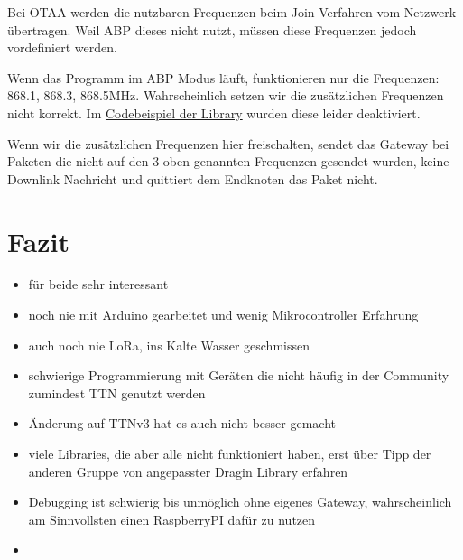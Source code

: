 \documentclass[12pt]{article}
\begin{document}
        Bei OTAA werden die nutzbaren Frequenzen beim Join-Verfahren vom Netzwerk übertragen.
        Weil ABP dieses nicht nutzt, müssen diese Frequenzen jedoch vordefiniert werden.

        Wenn das Programm im ABP Modus läuft, funktionieren nur die Frequenzen: 868.1, 868.3, 868.5MHz.
        Wahrscheinlich setzen wir die zusätzlichen Frequenzen nicht korrekt.
        Im \href{https://github.com/dragino/arduino-lmic/blob/f2775468e19b2c2a35557ef2f8255cffb2a783be/examples/ttn-abp/ttn-abp.ino#L180}{Codebeispiel der Library}
        wurden diese leider deaktiviert.

        Wenn wir die zusätzlichen Frequenzen hier freischalten, sendet das Gateway bei Paketen die nicht auf den 3 oben genannten Frequenzen gesendet wurden, keine Downlink Nachricht
        und quittiert dem Endknoten das Paket nicht.


        
  \section{Fazit}
    \begin{itemize}
      \item für beide sehr interessant
      \item noch nie mit Arduino gearbeitet und wenig Mikrocontroller Erfahrung
      \item auch noch nie LoRa, ins Kalte Wasser geschmissen
      \item schwierige Programmierung mit Geräten die nicht häufig in der Community zumindest TTN genutzt werden
      \item Änderung auf TTNv3 hat es auch nicht besser gemacht
      \item viele Libraries, die aber alle nicht funktioniert haben, erst über Tipp der anderen Gruppe von angepasster Dragin Library erfahren
      \item Debugging ist schwierig bis unmöglich ohne eigenes Gateway, wahrscheinlich am Sinnvollsten einen RaspberryPI dafür zu nutzen
      \item 
    \end{itemize}
    
  
\end{document}
